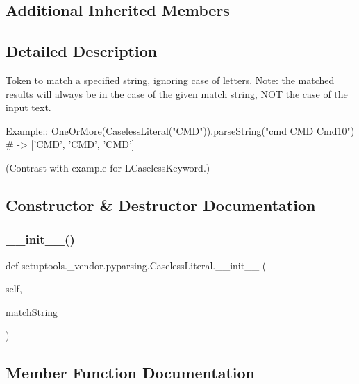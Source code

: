 \subsection*{Additional Inherited Members}


\subsection{Detailed Description}
\begin{DoxyVerb}Token to match a specified string, ignoring case of letters.
Note: the matched results will always be in the case of the given
match string, NOT the case of the input text.

Example::
    OneOrMore(CaselessLiteral("CMD")).parseString("cmd CMD Cmd10") # -> ['CMD', 'CMD', 'CMD']
    
(Contrast with example for L{CaselessKeyword}.)
\end{DoxyVerb}
 

\subsection{Constructor \& Destructor Documentation}
\mbox{\label{classsetuptools_1_1__vendor_1_1pyparsing_1_1CaselessLiteral_addabb133817e090020fa036c6d80b642}} 
\subsubsection{\texorpdfstring{\+\_\+\+\_\+init\+\_\+\+\_\+()}{\_\_init\_\_()}}
{\footnotesize\ttfamily def setuptools.\+\_\+vendor.\+pyparsing.\+Caseless\+Literal.\+\_\+\+\_\+init\+\_\+\+\_\+ (\begin{DoxyParamCaption}\item[{}]{self,  }\item[{}]{match\+String }\end{DoxyParamCaption})}



\subsection{Member Function Documentation}
\mbox{\label{classsetuptools_1_1__vendor_1_1pyparsing_1_1CaselessLiteral_a5e1ea0886b7a8b59fd5e178fbea79cc6}} 
